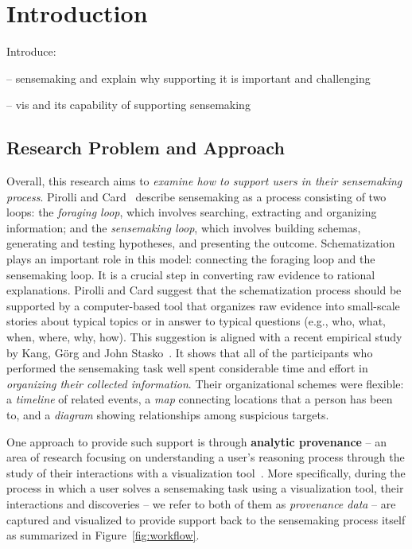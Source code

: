 \chapter{Introduction}

\graphicspath{{Chapter1/figures/}}

Introduce:

-- sensemaking and explain why supporting it is important and challenging

-- vis and its capability of supporting sensemaking

\section{Research Problem and Approach}
Overall, this research aims to \emph{examine how to support users in their sensemaking process}. Pirolli and Card~\cite{Pirolli2005} describe sensemaking as a process consisting of two loops: the \emph{foraging loop}, which involves searching, extracting and organizing information; and the \emph{sensemaking loop}, which involves building schemas, generating and testing hypotheses, and presenting the outcome. Schematization plays an important role in this model: connecting the foraging loop and the sensemaking loop. It is a crucial step in converting raw evidence to rational explanations. Pirolli and Card suggest that the schematization process should be supported by a computer-based tool that organizes raw evidence into small-scale stories about typical topics or in answer to typical questions (e.g., who, what, when, where, why, how). This suggestion is aligned with a recent empirical study by Kang, Görg and John Stasko~\cite{Kang2011}. It shows that all of the participants who performed the sensemaking task well spent considerable time and effort in \emph{organizing their collected information}. Their organizational schemes were flexible: a \emph{timeline} of related events, a \emph{map} connecting locations that a person has been to, and a \emph{diagram} showing relationships among suspicious targets.

One approach to provide such support is through \textbf{analytic provenance} -- an area of research focusing on understanding a user's reasoning process through the study of their interactions with a visualization tool~\cite{North2011}. More specifically, during the process in which a user solves a sensemaking task using a visualization tool, their interactions and discoveries -- we refer to both of them as \emph{provenance data} -- are captured and visualized to provide support back to the sensemaking process itself as summarized in Figure~\ref{fig:workflow}. 

